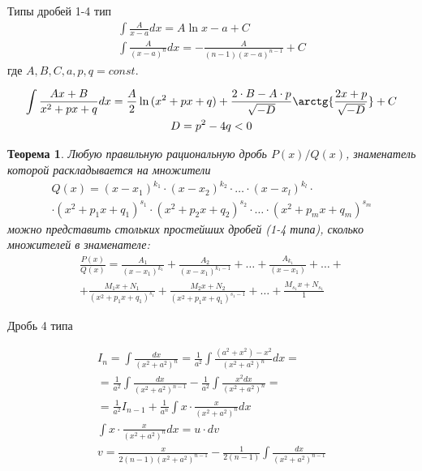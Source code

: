 \documentclass[a4paper,12pt,oneside]{extbook}
\theoremstyle{numbered}
\theoremstyle{unnumbered}
\theoremstyle{named}
\newtheorem{theorem}{Теорема}[section]
\theoremstyle{unnumbered}
\theoremstyle{named}
\theoremstyle{named}
\theoremstyle{named}
\begin{document}
Типы дробей
1-4 тип
\begin{gather*}
    \int \frac{A}{x - a}dx = A\ln{x - a} + C \\
    \int \frac{A}{(x - a)^n}dx = -\frac{A}{(n - 1)(x - a)^{n - 1}} + C
\end{gather*}
где \(A, B, C, a, p, q = const\).

\begin{gather*}
    \int \frac{Ax + B}{x^2 + px + q}dx = \frac{A}{2} \ln{(x^2 + px + q)} + \frac{2 \cdot B - A \cdot p}{\sqrt{-D}} \arctg{\frac{2x + p}{\sqrt{-D}}} + C \\
    D = p^2 - 4q < 0
\end{gather*}

\begin{theorem}
    Любую правильную рациональную дробь \(P(x) / Q(x)\), знаменатель которой раскладывается на множители
    \begin{equation}
        \begin{gathered}
            Q(x) = (x - x_1)^{k_1} \cdot (x - x_2)^{k_2} \cdot \ldots \cdot (x - x_l)^{k_l} \cdot \\
            \cdot (x^2 + p_1x + q_1)^{s_1} \cdot (x^2 + p_2x + q_2)^{s_2} \cdot \ldots \cdot (x^2 + p_mx + q_m)^{s_m}
        \end{gathered}
    \end{equation}
    можно представить стольких простейших дробей (1-4 типа), сколько множителей в знаменателе:
    \begin{gather*}
        \frac{P(x)}{Q(x)} = \frac{A_1}{(x - x_1)^{k_1}} + \frac{A_2}{(x - x_1)^{k_1 - 1}} + \ldots + \frac{A_{k_1}}{(x - x_1)} + \ldots + \\
        + \frac{M_1x + N_1}{(x^2 + p_1x + q_1)^{s_1}} + \frac{M_2x + N_2}{(x^2 + p_1x + q_1)^{s_1 - 1}} + \ldots +  \frac{M_{s_1}x + N_{s_1}}{1}
    \end{gather*}
\end{theorem}

Дробь 4 типа

\begin{gather*}
    I_n = \int \frac{dx}{(x^2 + a^2)^n} = \frac{1}{a^2} \int \frac{(a^2 + x^2) - x^2}{(x^2 + a^2)^n}dx = \\
    = \frac{1}{a^2} \int \frac{dx}{(x^2 + a^2)^{n - 1}} - \frac{1}{a^2} \int \frac{x^2 dx}{(x^2 + a^2)^n} = \\
    = \frac{1}{a^2} I_{n - 1} + \frac{1}{a^n} \int x \cdot \frac{x}{(x^2 + a^2)^n} dx \\
    \int x \cdot \frac{x}{(x^2 + a^2)^n} dx = u \cdot dv \\
    v = \frac{x}{2(n - 1)(x^2 + a^2)^{n - 1}} - \frac{1}{2(n - 1)} \int \frac{dx}{(x^2 +a^2)^{n - 1}}
\end{gather*}
\end{document}
